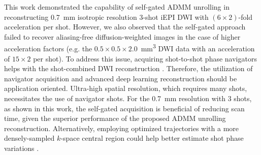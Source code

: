 \documentclass[AMA,STIX2COL,Linenumberson]{MRM}
\begin{document}

This work demonstrated the capability of self-gated ADMM unrolling in
reconstructing \SI{0.7}{mm} isotropic resolution 3-shot iEPI DWI
with $(6 \times 2)$-fold acceleration per shot.
However, we also observed that the self-gated approach
failed to recover aliasing-free diffusion-weighted images
in the case of higher acceleration factors
(e.g. the $0.5\times0.5\times2.0$~\si{mm^3} DWI data
with an acceleration of $15\times2$ per shot).
To address this issue, acquiring shot-to-shot phase navigators
helps with the shot-combined DWI reconstruction \cite{tan_2024_naviepi}.
Therefore, the utilization of navigator acquisition and
advanced deep learning reconstruction should be application oriented.
Ultra-high spatial resolution, which requires many shots, necessitates the use of navigator shots. 
For the 0.7~mm resolution with 3 shots, as shown in this work,
the self-gated acquisition is beneficial of reducing scan time,
given the superior performance of the proposed ADMM unrolling reconstruction.
Alternatively, employing optimized trajectories
with a more densely-sampled $k$-space central region
could help better estimate shot phase variations
\cite{liu_2004_diff_spiral}.
\end{document}
